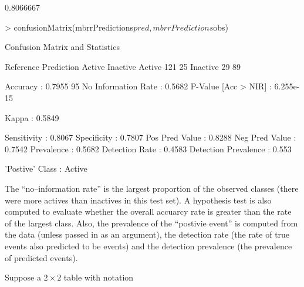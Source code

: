 \documentclass[12pt]{article}
\begin{document}
\begin{small}
\begin{Schunk}
\begin{Soutput}
[1] 0.8066667
\end{Soutput}
\begin{Sinput}
> confusionMatrix(mbrrPredictions$pred, mbrrPredictions$obs)
\end{Sinput}
\begin{Soutput}
Confusion Matrix and Statistics

          Reference
Prediction Active Inactive
  Active      121       25
  Inactive     29       89
                                        
             Accuracy : 0.7955          
               95% CI : (0.7417, 0.8424)
  No Information Rate : 0.5682          
  P-Value [Acc > NIR] : 6.255e-15       
                                        
                Kappa : 0.5849          
                                        
          Sensitivity : 0.8067          
          Specificity : 0.7807          
       Pos Pred Value : 0.8288          
       Neg Pred Value : 0.7542          
           Prevalence : 0.5682          
       Detection Rate : 0.4583          
 Detection Prevalence : 0.553           
                                        
      'Postive' Class : Active          
\end{Soutput}
\end{Schunk}
\end{small}

The ``no--information rate'' is the largest proportion of the observed classes (there were more actives than inactives in this test set). A hypothesis test is also computed to evaluate whether the overall accuarcy rate is greater than the rate of the largest class. Also, the prevalence of the ``postivie event'' is computed from the data (unless passed in as an argument), the detection rate (the rate of true events also 
predicted to be events) and the detection prevalence (the prevalence of predicted events).

Suppose a $2 $ table with notation
\end{document}

